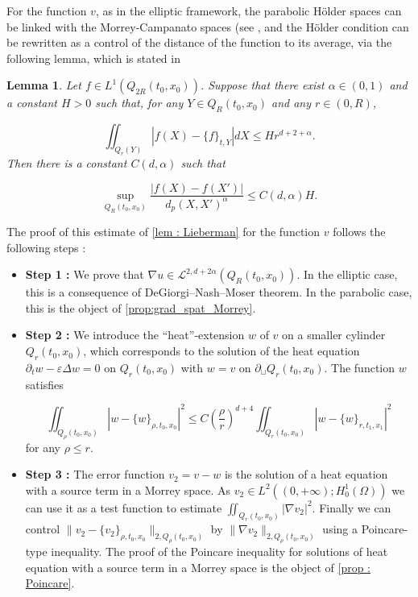 \documentclass[reqno,12pt,twoside]{amsart}
\newtheorem{lemma}{Lemma}[section]
\numberwithin{equation}{section} \numberwithin{theorem}{section}
\numberwithin{proposition}{section} \numberwithin{lemma}{section}
\numberwithin{corollary}{section}
\numberwithin{definition}{section} \numberwithin{remark}{section}
\begin{document}
For the function $v$, as in the elliptic framework, the parabolic Hölder spaces can be linked with the Morrey-Campanato spaces (see \cite[Section 5.1]{GM12}, and the Hölder condition can be rewritten as a control of the distance of the function to its average, via the following lemma, which is stated in \cite[Lemma 4.3]{L96}   
\begin{lemma}\label{lem : Lieberman}
Let $f\in L^1(Q_{2R}(t_0,x_0))$. Suppose that there exist $\alpha \in (0,1)$ and a constant $H >0$ such that, for any $Y\in Q_{R}(t_0,x_0)$ and any $r\in (0,R)$, 

\[\iint_{Q_r (Y)} |f(X) - \{f\}_{t,Y}|dX \leqslant H r^{d+2+\alpha}.\] 
Then there is a constant $C(d,\alpha)$ such that 

\[\sup_{Q_R(t_0,x_0)} \frac{|f(X) - f(X')|}{d_p (X, X')^{\alpha}} \leqslant C(d, \alpha) H.\]
\end{lemma}

The proof of this estimate of \eqref{lem : Lieberman} for the function $v$ follows the following steps : 

\begin{itemize}
\item \textbf{Step 1 :} We prove that $\nabla u \in \mathcal{L}^{2,d+2\alpha}(Q_R(t_0,x_0))$. In the elliptic case, this is a consequence of DeGiorgi--Nash--Moser theorem. In the parabolic case, this is the object of \autoref{prop:grad_spat_Morrey}.

\item \textbf{Step 2 :} We introduce the ``heat''-extension $w$ of $v$ on a smaller cylinder $Q_r(t_0,x_0)$, which corresponds to the solution of the heat equation $\partial_t w - \varepsilon \Delta w =0$ on $Q_r(t_0,x_0)$ with $w=v$ on $\partial_\sqcup Q_r(t_0,x_0)$. The function $w$ satisfies 

\[\iint_{Q_\rho(t_0,x_0)} |w -\{w\}_{\rho,t_0,x_0}|^2 \leqslant C \left(\frac{\rho}{r}\right)^{d+4} \iint_{Q_r(t_0,x_0)} |w -\{w\}_{r,t_1,x_1}|^2\]
for any $\rho\leqslant r$.

\item \textbf{Step 3 :} The error function $v_2 =v-w$ is the solution of a heat equation with a source term in a Morrey space. As $v_2\in L^2((0,+\infty);H_0^1(\Omega))$ we can use it as a test function to estimate $\iint_{Q_r(t_0,x_0)} |\nabla v_2|^2$. Finally we can control $\|v_2 -\{v_2\}_{\rho, t_0,x_0}\|_{2, Q_\rho(t_0,x_0)}$ by $\|\nabla v_2\|_{2,Q_\rho(t_0,x_0)}$ using a Poincare-type inequality. The proof of the Poincare inequality for solutions of heat equation with a source term in a Morrey space is the object of \autoref{prop : Poincare}.  
\end{itemize} 
\end{document}
